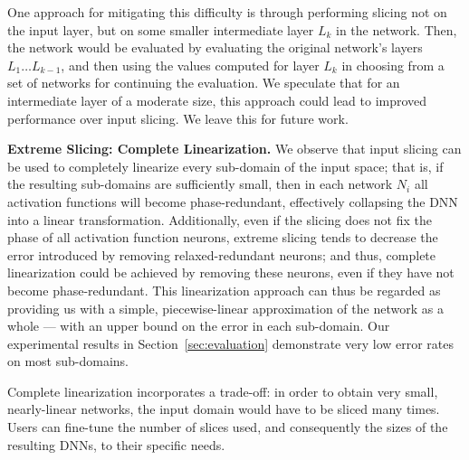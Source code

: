 \documentclass[10pt, conference, twocolumn, compsocconf]{IEEEtran}
\theoremstyle{remark}
\begin{document}
One approach for mitigating this difficulty is through performing
slicing not on the input layer, but on some smaller intermediate layer $L_k$
in the network. Then, the network would be evaluated by evaluating the
original network's layers $L_1\ldots L_{k-1}$, and then using the
values computed for layer $L_k$ in choosing from a set of networks for
continuing the evaluation. We speculate that for an intermediate layer
of a moderate size, this approach could lead to improved performance
over input slicing. We leave this for future work.



\medskip
\noindent
\textbf{Extreme Slicing: Complete Linearization.}  We observe that
input slicing can be used to completely linearize every sub-domain of
the input space; that is, if the resulting sub-domains are
sufficiently small, then in each network $N_i$ all activation
functions will become phase-redundant, effectively collapsing the DNN
into a linear transformation.  Additionally, even if the slicing does
not fix the phase of all activation function neurons, extreme slicing
tends to decrease the error introduced by removing relaxed-redundant
neurons; and thus, complete linearization could be achieved by
removing these neurons, even if they have not become phase-redundant.
This linearization approach can thus be regarded as providing us with
a simple, piecewise-linear approximation of the network as a whole ---
with an upper bound on the error in each sub-domain.  Our experimental
results in Section~\ref{sec:evaluation} demonstrate very low error
rates on most sub-domains.

Complete linearization incorporates a trade-off: in order to obtain
very small, nearly-linear networks, the input domain would have to be
sliced many times. Users can fine-tune the number of slices used, and
consequently the sizes of the resulting DNNs, to their specific needs.
\end{document}
